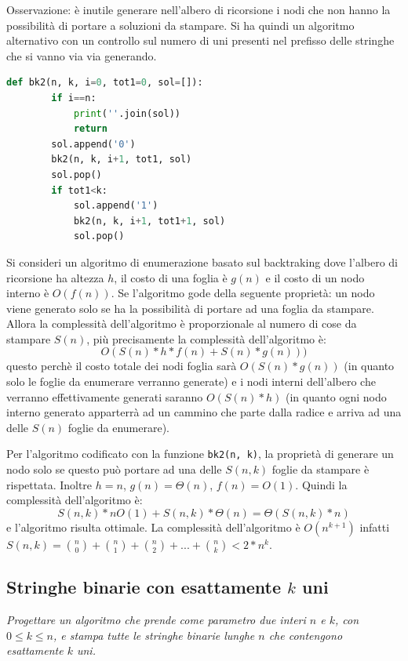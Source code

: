 Osservazione: è inutile generare nell'albero di ricorsione i nodi che non hanno la possibilità di portare a soluzioni da stampare. Si ha quindi un algoritmo alternativo con un controllo sul numero di uni presenti nel prefisso delle stringhe che si vanno via via generando.
\begin{lstlisting}[language=Python]
    def bk2(n, k, i=0, tot1=0, sol=[]): 
        if i==n:
            print(''.join(sol))
            return
        sol.append('0')
        bk2(n, k, i+1, tot1, sol)
        sol.pop()
        if tot1<k:
            sol.append('1')
            bk2(n, k, i+1, tot1+1, sol)
            sol.pop()
\end{lstlisting}

Si consideri un algoritmo di enumerazione basato sul backtraking dove l’albero di ricorsione ha altezza $h$, il costo di una foglia è $g(n)$ e il costo di un nodo interno è $O(f(n))$.
Se l’algoritmo gode della seguente proprietà: un nodo viene generato solo se ha la possibilità di portare ad una foglia da stampare. Allora la complessità dell’algoritmo è proporzionale al numero di cose da stampare $S(n)$, più precisamente la complessità dell’algoritmo è:
\begin{equation*}
    O(S(n)*h*f(n) + S(n)*g(n)))    
\end{equation*}
questo perchè il costo totale dei nodi foglia sarà $O(S(n) * g(n))$ (in quanto solo le foglie
da enumerare verranno generate) e i nodi interni dell’albero che verranno effettivamente generati saranno $O(S(n) * h)$ (in quanto ogni nodo interno generato apparterrà ad un cammino che parte dalla radice e arriva ad una delle $S(n)$ foglie da enumerare).

Per l'algoritmo codificato con la funzione \verb|bk2(n, k)|, la proprietà di generare un nodo solo se questo può portare ad una delle $S(n, k)$ foglie da stampare è rispettata. Inoltre $h = n$, $g(n) = \Theta(n)$, $f(n) = O(1)$. Quindi la complessità dell'algoritmo è:
\begin{equation*}
    S(n, k) * nO(1) + S(n, k) * \Theta(n) = \Theta(S(n, k) * n)    
\end{equation*}
e l'algoritmo risulta ottimale. La complessità dell'algoritmo è $O(n ^{k + 1})$ infatti $S(n,k)= \binom{n}{0} + \binom{n}{1} + \binom{n}{2} + ... + \binom{n}{k} < 2 * n^k$.

\subsection{Stringhe binarie con esattamente $k$ uni}
\textit{Progettare un algoritmo che prende come parametro due interi $n$ e $k$, con $0\leq k\leq n$, e stampa tutte le stringhe binarie lunghe $n$ che contengono esattamente $k$ uni.}

